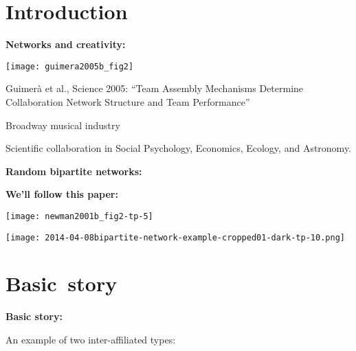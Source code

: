 

\section{Introduction}





  \textbf{Networks and creativity:}

      
    \texttt{[image: guimera2005b\_fig2]}
    
    
    
      Guimer\`{a} et al., Science 2005:\cite{guimera2005b}
      ``Team Assembly Mechanisms Determine Collaboration Network Structure and Team Performance''
     
      Broadway musical industry
     
      Scientific collaboration in Social Psychology, Economics, Ecology, and Astronomy.
    
  



  \textbf{Random bipartite networks:}

  \textbf{We'll follow this paper:}
  

  \begin{center}
    \texttt{[image: newman2001b\_fig2-tp-5]}
  \end{center}


\begin{center}
      \texttt{[image: 2014-04-08bipartite-network-example-cropped01-dark-tp-10.png]}
  \end{center}


\section{Basic\ story}



  \textbf{Basic story:}
    
    
      An example of two inter-affiliated types:
      

